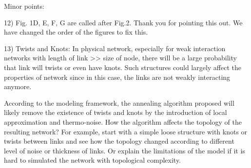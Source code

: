 \documentclass[11pt]{article}
\begin{document}
Minor points: 
\begin{response}{
12) Fig. 1D, E, F, G are called after Fig.2. 
}
Thank you for pointing this out. 
We have changed the order of the figures to fix this. 


\end{response}
\begin{response}{
13) Twists and Knots: In physical network, especially for weak interaction networks with length of link >> size of node, there will be a large probability that link will twists or even have knots. Such structures could largely affect the properties of network since in this case, the links are not weakly interacting anymore. 

According to the modeling framework, the annealing algorithm proposed will likely remove the existence of twists and knots by the introduction of local approximation and thermo-noise. How the algorithm affects the topology of the resulting network? For example, start with a simple loose structure with knots or twists between links and see how the topology changed according to different level of noise or thickness of links. Or explain the limitations of the model if it is hard to simulated the network with topological complexity.
}


\end{response}
\end{document}
